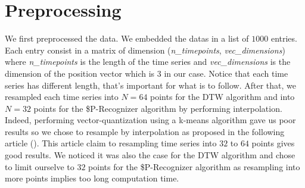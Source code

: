 \section{Preprocessing}

We first preprocessed the data. We embedded the datas in a list of $1000$ entries. Each entry consist in a matrix of dimension (\textit{n\_timepoints}, \textit{vec\_dimensions}) where \textit{n\_timepoints} is the length of the time series and \textit{vec\_dimensions} is the dimension of the position vector which is $3$ in our case. Notice that each time series has different length, that's important for what is to follow. 
After that, we resampled each time series into $N = 64$ points for the DTW algorithm and into $N=32$ points for the \$P-Recognizer algorithm by performing interpolation. Indeed, performing vector-quantization using a k-means algorithm gave us poor results so we chose to resample by interpolation as proposed in the following article (\cite{Wobbrock_Wilson_Li_2007}). This article claim to resampling time series into $32$ to $64$ points gives good results. We noticed it was also the case for the DTW algorithm and chose to limit ourselve to $32$ points for the \$P-Recognizer algorithm as resampling into more points implies too long computation time.